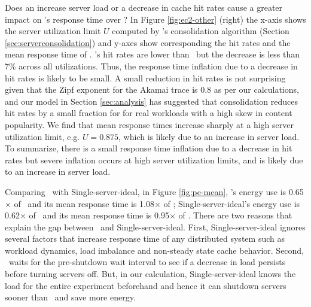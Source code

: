 Does  an increase server load or a decrease in cache hit rates cause a greater impact on \shrink's response time over \peakS? 
In Figure \ref{fig:ec2-other} (right) the x-axis shows the server utilization limit $U$ computed by \shrink's consolidation algorithm (Section \ref{sec:serverconsolidation}) and y-axes show corresponding the  hit rates and the mean response time of \shrink. \shrink's  hit rates are lower than \peakS\ but the decrease is less than 7\% across all utilizations. 
Thus, the response time inflation due to a decrease in hit rates is likely to be small. A small reduction in hit rates is not surprising given that the Zipf exponent for the Akamai trace is 0.8 as per our calculations, and our model in Section \ref{sec:analysis} has suggested that  consolidation reduces hit rates by a small fraction for for real workloads with a high skew in content popularity.  We find that mean response times increase sharply at  a high server utilization limit, e.g. $U=0.875$, which is likely due to an increase in server load. To summarize, there is a small response time inflation due to a decrease in hit rates but severe inflation occurs at high server utilization limits, and is likely due to an increase in server  load.


Comparing \shrink\ with Single-server-ideal, in Figure \ref{fig:pe-mean}, \shrink's energy use is 0.65$\times$ of \peakS\ and its mean response time is 1.08$\times$ of \peakS; Single-server-ideal's energy use is 0.62$\times$  of \peakS\ and its mean response time is 0.95$\times$ of \peakS.  
There are two reasons that explain the gap between \shrink\ and Single-server-ideal. First, Single-server-ideal ignores several factors that increase response time of any distributed system such as workload dynamics, load imbalance and non-steady state cache behavior. Second, \shrink\ waits for the pre-shutdown wait interval to see if a decrease in load persists before turning servers off. But, in our calculation, Single-server-ideal knows the load for the entire experiment beforehand and hence it can shutdown servers sooner than \shrink\ and save more energy.

